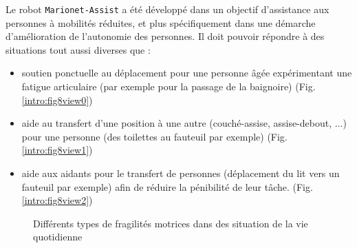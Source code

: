 Le robot {\tt Marionet-Assist} a été développé dans un objectif d'assistance 
aux personnes à mobilités réduites, et plus spécifiquement dans une démarche 
d'amélio\-ration de l'autonomie des personnes. Il doit pouvoir répondre 
à des situations tout aussi diverses que :
\begin{itemize}
 \item soutien ponctuelle au déplacement pour une personne âgée expérimentant 
une fatigue articulaire (par exemple pour la passage de la baignoire) 
(Fig.\ref{intro:fig8view0})
 \item aide au transfert d'une position à une autre (couché-assise, assise-debout, $\dots$) pour une personne (des 
toilettes au fauteuil par exemple) 
(Fig.\ref{intro:fig8view1})
 \item aide aux aidants pour le transfert de personnes (déplacement du lit vers un fauteuil par exemple) afin de r\'eduire 
la p\'enibilit\'e de leur t\^ache. 
(Fig.\ref{intro:fig8view2})
\end{itemize}

\begin{figure}[htp]
  \centering
   \hfill
   \hfill
   \hfill
    \caption{\footnotesize{Différents types de fragilités motrices dans des 
situation de la vie quotidienne}}
\label{intro:fig8}
\end{figure}

